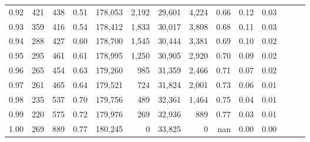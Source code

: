 \begin{tabular}{rrrrrrrrrrrrrr}
0.92 &    421 &  438 &  0.51 &  178,053 &    2,192 &  29,601 &   4,224 &  0.66 &  0.12 &      0.03 \\
0.93 &    359 &  416 &  0.54 &  178,412 &    1,833 &  30,017 &   3,808 &  0.68 &  0.11 &      0.03 \\
0.94 &    288 &  427 &  0.60 &  178,700 &    1,545 &  30,444 &   3,381 &  0.69 &  0.10 &      0.02 \\
0.95 &    295 &  461 &  0.61 &  178,995 &    1,250 &  30,905 &   2,920 &  0.70 &  0.09 &      0.02 \\
0.96 &    265 &  454 &  0.63 &  179,260 &      985 &  31,359 &   2,466 &  0.71 &  0.07 &      0.02 \\
0.97 &    261 &  465 &  0.64 &  179,521 &      724 &  31,824 &   2,001 &  0.73 &  0.06 &      0.01 \\
0.98 &    235 &  537 &  0.70 &  179,756 &      489 &  32,361 &   1,464 &  0.75 &  0.04 &      0.01 \\
0.99 &    220 &  575 &  0.72 &  179,976 &      269 &  32,936 &     889 &  0.77 &  0.03 &      0.01 \\
1.00 &    269 &  889 &  0.77 &  180,245 &        0 &  33,825 &       0 &   nan &  0.00 &      0.00 \\
\bottomrule
\end{tabular}
